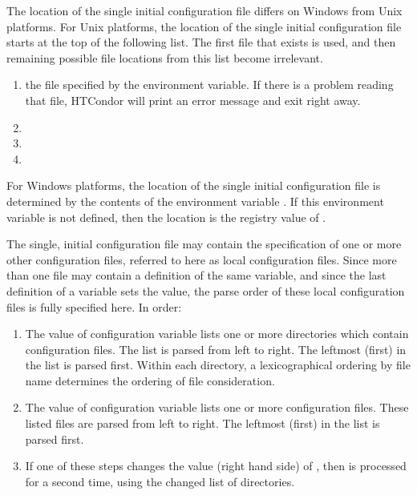 The location of the single initial configuration file differs on
Windows from Unix platforms. 
For Unix platforms, 
the location of the single initial configuration file starts at 
the top of the following list.
The first file that exists is used,
and then remaining possible file locations from this list become irrelevant.

\begin{enumerate}
   \item the file specified by the  environment variable.
   If there is a problem reading that file, HTCondor will print an error
   message and exit right away.
   \item {}
   \item {}
   \item {}
\end{enumerate}

For Windows platforms, 
the location of the single initial configuration file is determined by 
the contents of the environment variable .
If this environment variable is not defined, 
then the location is the registry value of 
. 

The single, initial configuration file may contain the specification 
of one or more other configuration files, referred to here as
local configuration files.
Since more than one file may contain a definition of the same variable,
and since the last definition of a variable sets the value, 
the parse order of these local configuration files
is fully specified here. 
In order: 
\begin{enumerate}
   \item The value of configuration variable  lists 
   one or more directories which contain configuration files. 
   The list is parsed from left to right. 
   The leftmost (first) in the list is parsed first. 
   Within each directory, 
   a lexicographical ordering by file name determines the ordering of 
   file consideration.
   \item The value of configuration variable  
   lists one or more configuration files. 
   These listed files are parsed from  left to right.
   The leftmost (first) in the list is parsed first.
   \item If one of these steps changes the value (right hand side) of 
   , 
   then  is processed for a second time,
    using the changed list of directories.
\end{enumerate}

